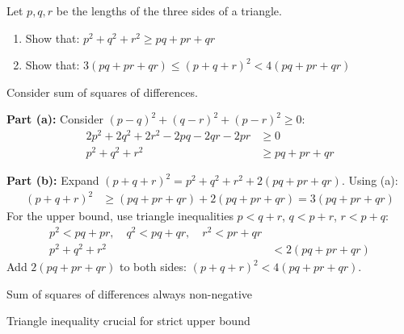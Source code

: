 \begin{problem}
Let $p, q, r$ be the lengths of the three sides of a triangle.
\begin{enumerate}
    \item[(a)] Show that: $p^2 + q^2 + r^2 \ge pq + pr + qr$
    \item[(b)] Show that: $3(pq + pr + qr) \le (p + q + r)^2 < 4(pq + pr + qr)$
\end{enumerate}
\end{problem}

\begin{hint}
Consider sum of squares of differences.
\end{hint}

\begin{solution}
\textbf{Part (a):} Consider $(p-q)^2 + (q-r)^2 + (p-r)^2 \ge 0$:
\begin{align*}
2p^2 + 2q^2 + 2r^2 - 2pq - 2qr - 2pr &\ge 0\\
p^2 + q^2 + r^2 &\ge pq + pr + qr
\end{align*}

\textbf{Part (b):} Expand $(p+q+r)^2 = p^2 + q^2 + r^2 + 2(pq+pr+qr)$. Using (a):
\begin{align*}
(p+q+r)^2 &\ge (pq+pr+qr) + 2(pq+pr+qr) = 3(pq+pr+qr)
\end{align*}
For the upper bound, use triangle inequalities $p < q+r$, $q < p+r$, $r < p+q$:
\begin{align*}
p^2 < pq + pr, \quad q^2 < pq + qr, \quad r^2 < pr + qr\\
p^2 + q^2 + r^2 &< 2(pq + pr + qr)
\end{align*}
Add $2(pq+pr+qr)$ to both sides: $(p+q+r)^2 < 4(pq+pr+qr)$.
\end{solution}

\begin{takeaways}
\item Sum of squares of differences always non-negative
\item Triangle inequality crucial for strict upper bound
\end{takeaways}

